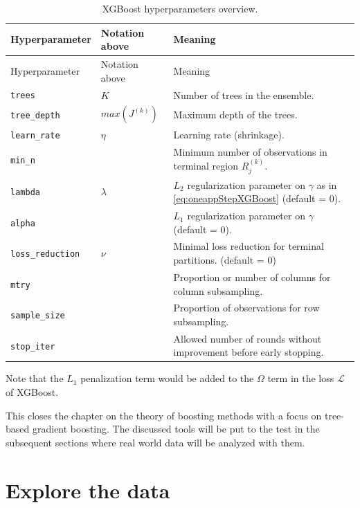 \documentclass[
]{book}
\begin{document}
\begin{longtable}[]{@{}
  >{\raggedright\arraybackslash}p{}
  >{\raggedright\arraybackslash}p{}
  >{\raggedright\arraybackslash}p{}@{}}
\caption{\label{tab:xgboostHyper} XGBoost hyperparameters overview.}\tabularnewline
\toprule
Hyperparameter & Notation above & Meaning \\
\midrule
\endfirsthead
\toprule
Hyperparameter & Notation above & Meaning \\
\midrule
\endhead
\texttt{trees} & \(K\) & Number of trees in the ensemble. \\
\texttt{tree\_depth} & \(max(J^{(k)})\) & Maximum depth of the trees. \\
\texttt{learn\_rate} & \(\eta\) & Learning rate (shrinkage). \\
\texttt{min\_n} & & Minimum number of observations in terminal region \(R^{(k)}_j\). \\
\texttt{lambda} & \(\lambda\) & \(L_2\) regularization parameter on \(\gamma\) as in \eqref{eq:oneappStepXGBoost} (default = 0). \\
\texttt{alpha} & & \(L_1\) regularization parameter on \(\gamma\) (default = 0). \\
\texttt{loss\_reduction} & \(\nu\) & Minimal loss reduction for terminal partitions. (default = 0) \\
\texttt{mtry} & & Proportion or number of columns for column subsampling. \\
\texttt{sample\_size} & & Proportion of observations for row subsampling. \\
\texttt{stop\_iter} & & Allowed number of rounds without improvement before early stopping. \\
\bottomrule
\end{longtable}

Note that the \(L_1\) penalization term would be added to the \(\Omega\) term in the loss \(\mathcal{L}\) of XGBoost.

This closes the chapter on the theory of boosting methods with a focus on tree-based gradient boosting. The discussed tools will be put to the test in the subsequent sections where real world data will be analyzed with them.

\hypertarget{eda}{%
\chapter{Explore the data}\label{eda}}
\end{document}
